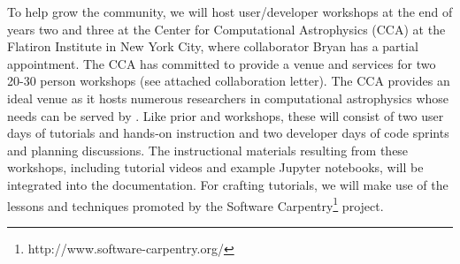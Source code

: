 To help grow the \grackle{} community, we will host user/developer
workshops at the end of years two and three at the Center for
Computational Astrophysics (CCA) at the Flatiron Institute in New York
City, where collaborator Bryan has a partial appointment.  The CCA has
committed to provide a venue and services for two 20-30 person
workshops (see attached collaboration letter).  The CCA provides an
ideal venue as it hosts numerous researchers in computational
astrophysics whose needs can be served by \grackle{}.  Like prior
\enzo{} and \yt{} workshops, these will consist of two user days of
tutorials and hands-on instruction and two developer days of code
sprints and planning discussions.  The instructional materials
resulting from these workshops, including tutorial videos and example
Jupyter notebooks, will be integrated into the \grackle{}
documentation. For crafting tutorials, we will make use of the lessons
and techniques promoted by the Software
Carpentry\footnote{http://www.software-carpentry.org/} project.
